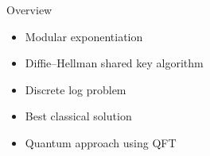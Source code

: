 
\begin{frame}{Overview}
\begin{itemize}
    \item Modular exponentiation
    \item Diffie--Hellman shared key algorithm
    \item Discrete log problem
    \item Best classical solution
    \item Quantum approach using QFT
\end{itemize}
\end{frame}
